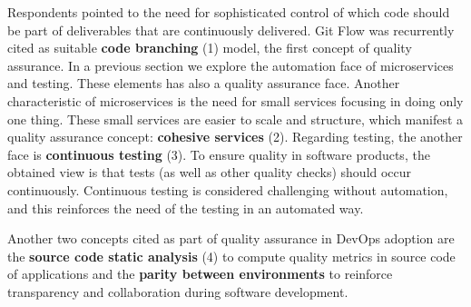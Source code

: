 Respondents pointed to the need for sophisticated control of which code should
be part of deliverables that are continuously delivered. Git Flow was
recurrently cited as suitable \textbf{code branching} (1) model, the first
concept of quality assurance.
In a previous section we explore the automation face of
microservices and testing. These elements has also a quality assurance face.
Another characteristic of microservices is the need for small services focusing
in doing only one thing. These small services are easier to scale and
structure, which manifest a quality assurance concept: \textbf{cohesive
services} (2). Regarding testing, the another face is \textbf{continuous
testing} (3). To ensure quality in software products, the obtained view is that
tests (as well as other quality checks) should occur continuously. Continuous testing
is considered challenging without automation, and this reinforces the need of
the testing in an automated way.

Another two concepts cited as part of quality assurance in DevOps adoption are
the \textbf{source code static analysis} (4) to compute quality metrics in
source code of applications and the \textbf{parity between environments} to
reinforce transparency and collaboration during software development.
